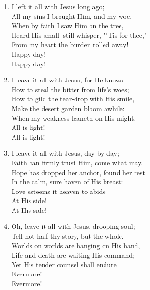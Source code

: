 \documentclass[11pt,a4paper]{article}
\begin{document}
\begin{enumerate}
    \item I left it all with Jesus long ago; \\
        All my sins I brought Him, and my woe. \\
        When by faith I saw Him on the tree, \\
        Heard His small, still whisper, "'Tis for thee," \\
        From my heart the burden rolled away! \\
        Happy day! \\
        Happy day!

    \item I leave it all with Jesus, for He knows \\
        How to steal the bitter from life's woes; \\
        How to gild the tear-drop with His smile, \\
        Make the desert garden bloom awhile: \\
        When my weakness leaneth on His might, \\
        All is light! \\
        All is light!

    \item I leave it all with Jesus, day by day; \\
        Faith can firmly trust Him, come what may. \\
        Hope has dropped her anchor, found her rest \\
        In the calm, sure haven of His breast: \\
        Love esteems it heaven to abide \\
        At His side! \\
        At His side!

    \item Oh, leave it all with Jesus, drooping soul; \\
        Tell not half thy story, but the whole. \\
        Worlds on worlds are hanging on His hand, \\
        Life and death are waiting His command; \\
        Yet His tender counsel shall endure \\
        Evermore! \\
        Evermore!

\end{enumerate}
\end{document}
